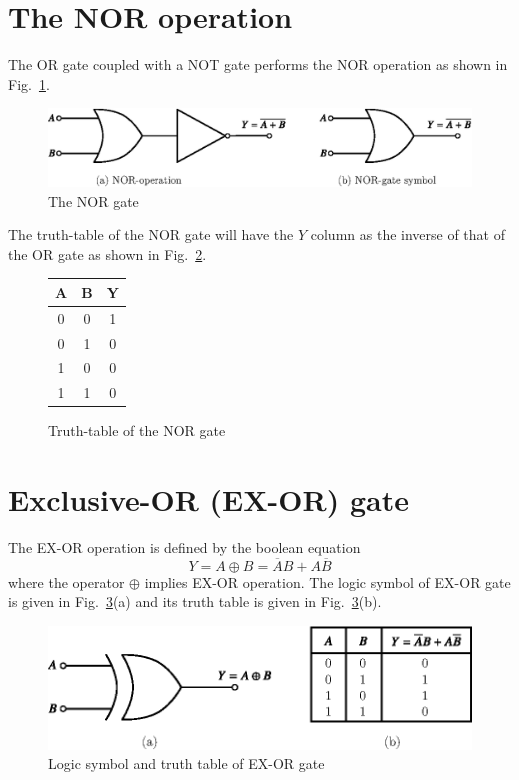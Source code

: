\section{The NOR operation}\label{sec6.23}

The OR gate coupled with a NOT gate performs the NOR operation as shown in Fig.~\ref{fig6.20}.
\begin{figure}[H]
\centering
\includegraphics{chap6/fig93_6.20.eps}
\caption{The NOR gate}\label{fig6.20}
\end{figure}

The truth-table of the NOR gate will have the $Y$ column as the inverse of that of the OR gate as shown in Fig.~\ref{fig6.21}.
\begin{figure}[H]
\centering
\tabcolsep=8pt
\renewcommand{\arraystretch}{1.25}
\begin{tabular}{|cc|c|}
\hline
{\bf A} & {\bf B} & {\bf Y}\\
\hline
0 & 0 & 1\\
0 & 1 & 0\\
1 & 0 & 0\\
1 & 1 & 0\\
\hline
\end{tabular}
\caption{Truth-table of the NOR gate}\label{fig6.21}
\end{figure}

\section{Exclusive-OR (EX-OR) gate}\label{sec6.24}

The EX-OR operation is defined by the boolean equation
$$
Y=A\oplus B=\overline{A}B+A\overline{B}
$$
where the operator $\oplus$ implies EX-OR operation. The logic symbol of EX-OR gate is given in Fig.~\ref{fig6.22}(a) and its truth table is given in Fig.~\ref{fig6.22}(b).
\begin{figure}[H]
\centering
\includegraphics{chap6/fig94_6.22.eps}
\medskip
\caption{Logic symbol and truth table of EX-OR gate}\label{fig6.22}
\end{figure}

